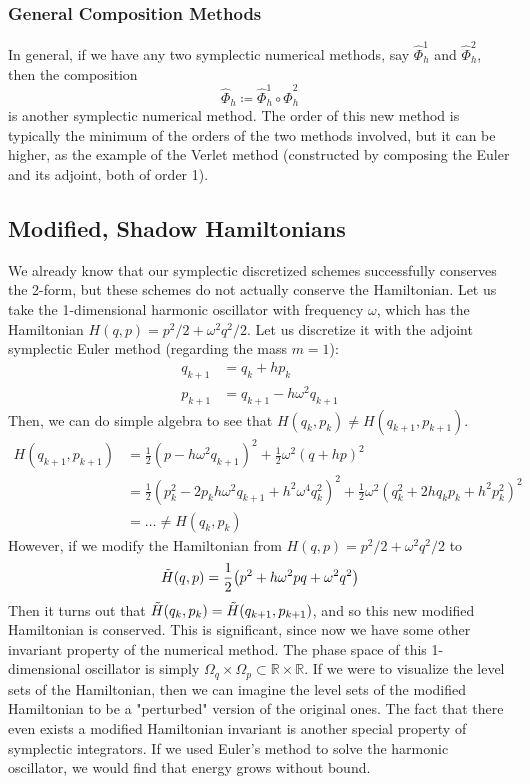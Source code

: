 \documentclass{article}
\begin{document}
    \subsubsection{General Composition Methods}

      In general, if we have any two symplectic numerical methods, say $\hat{\Phi}_h^1$ and $\hat{\Phi}_h^2$, then the composition 
      \[\hat{\Phi}_h \coloneqq \hat{\Phi}_h^1 \circ \hat{\Phi}_h^2\]
      is another symplectic numerical method. The order of this new method is typically the minimum of the orders of the two methods involved, but it can be higher, as the example of the Verlet method (constructed by composing the Euler and its adjoint, both of order 1). 

  \subsection{Modified, Shadow Hamiltonians}

    We already know that our symplectic discretized schemes successfully conserves the 2-form, but these schemes do not actually conserve the Hamiltonian. Let us take the 1-dimensional harmonic oscillator with frequency $\omega$, which has the Hamiltonian $H(q, p) = p^2/2 + \omega^2 q^2/2$. Let us discretize it with the adjoint symplectic Euler method (regarding the mass $m = 1$): 
    \begin{align*}
        q_{k+1} & = q_k + h p_k \\ 
        p_{k+1} & = q_{k+1} - h \omega^2 q_{k+1}
    \end{align*}
    Then, we can do simple algebra to see that $H(q_k, p_k) \neq H(q_{k+1}, p_{k+1})$. 
    \begin{align*}
        H(q_{k+1}, p_{k+1}) & = \frac{1}{2} (p - h \omega^2 q_{k+1})^2 + \frac{1}{2} \omega^2 (q + h p)^2 \\
        & = \frac{1}{2} (p_k^2 - 2p_kh \omega^2 q_{k+1} + h^2 \omega^4 q_k^2)^2 + \frac{1}{2} \omega^2 (q_k^2 + 2hq_k p_k + h^2 p_k^2)^2 \\
        &  = \ldots \neq H(q_k, p_k) 
    \end{align*}
    However, if we modify the Hamiltonian from $H(q, p) = p^2 /2 + \omega^2 q^2 / 2$ to 
    \[\Tilde{H} (q, p) = \frac{1}{2} \big( p^2 + h \omega^2 p q + \omega^2 q^2 \big)\]
    Then it turns out that $\Tilde{H}(q_k, p_k) = \Tilde{H}(q_{k+1}, p_{k+1})$, and so this new modified Hamiltonian is conserved. This is significant, since now we have some other invariant property of the numerical method. The phase space of this 1-dimensional oscillator is simply $\Omega_q \times \Omega_p \subset \mathbb{R} \times \mathbb{R}$. If we were to visualize the level sets of the Hamiltonian, then we can imagine the level sets of the modified Hamiltonian to be a "perturbed" version of the original ones. The fact that there even exists a modified Hamiltonian invariant is another special property of symplectic integrators. If we used Euler's method to solve the harmonic oscillator, we would find that energy grows without bound. 
\end{document}
